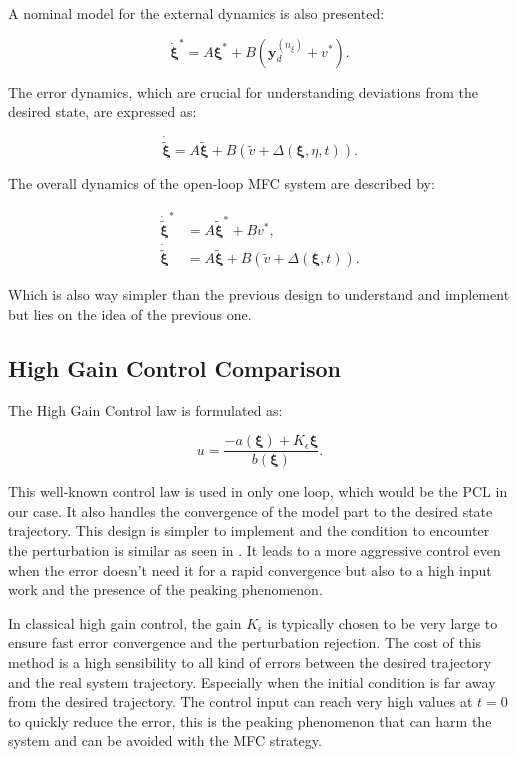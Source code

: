 A nominal model for the external dynamics is also presented:

\begin{equation}
    \dot{\boldsymbol{\xi}}^* = A\boldsymbol{\xi}^* + B(\boldsymbol{y}_d^{(n_\xi)} + v^*).
\end{equation}

The error dynamics, which are crucial for understanding deviations from the desired state, are expressed as:

\begin{equation}
    \dot{\tilde{\boldsymbol{\xi}}} = A\tilde{\boldsymbol{\xi}} + B(\tilde{v} + \Delta(\boldsymbol{\xi}, \eta, t)).
\end{equation}

The overall dynamics of the open-loop MFC system are described by:

\begin{align}
    \dot{\tilde{\boldsymbol{\xi}}}^* &= A\tilde{\boldsymbol{\xi}}^* + Bv^*, \\
    \dot{\tilde{\boldsymbol{\xi}}} &= A\tilde{\boldsymbol{\xi}} + B(\tilde{v} + \Delta(\boldsymbol{\xi}, t)).
\end{align}

Which is also way simpler than the previous design to understand and implement but lies on the idea of the previous 
one. 

\subsection{High Gain Control Comparison}

The High Gain Control law is formulated as:

\begin{equation}
    u = \frac{-a(\boldsymbol{\xi}) + K_\epsilon \boldsymbol{\xi}}{b(\boldsymbol{\xi})}.
\end{equation}

This well-known control law is used in only one loop, which would be the PCL in our case. It also handles the convergence of the model part to the desired state trajectory. This design is simpler to implement and the condition to encounter the perturbation is similar as seen in \cite{Willkomm2023MFC}. It leads to a more aggressive control even when the error doesn't need it for a rapid convergence but also to a high input work and the presence of the peaking phenomenon.

In classical high gain control, the gain \(K_\epsilon\) is typically chosen to be very large 
to ensure fast error convergence and the perturbation rejection. The cost of this method is a high
sensibility to all kind of errors between the desired trajectory and the real system trajectory. Especially 
when the initial condition is far away from the desired trajectory. The control input can reach very high values
at \(t=0\) to quickly reduce the error, this is the peaking phenomenon that can harm the system and can 
be avoided with the MFC strategy.

